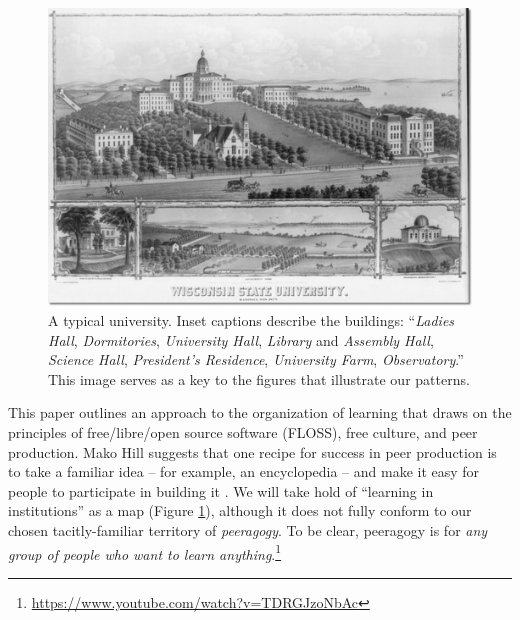 
\begin{figure}
\vspace{-1.15cm}
\begin{center}
\includegraphics[width=.45\textwidth,trim=0 30 10 2, clip=true]{wisconsin-map}
\end{center}
\vspace{-.4cm}
\captionsetup{font=footnotesize,width=.52\textwidth}
\caption{A typical university.  Inset captions describe the buildings:
  ``\textsl{Ladies Hall}, \textsl{Dormitories}, \textsl{University
    Hall}, \textsl{Library} and \textsl{Assembly Hall},
  \textsl{Science Hall}, \textsl{President's Residence},
  \textsl{University Farm}, \textsl{Observatory}.''  This image serves
  as a key to the figures that illustrate our patterns.\label{madison-map}}
\vspace{-1.5cm}
\end{figure}

This paper  outlines an approach to the organization of learning that draws on the principles of free\slash libre\slash open source software (FLOSS), free culture, and peer production.
Mako Hill suggests that one recipe for success in peer production is to take a familiar idea -- for example, an encyclopedia -- and make it easy for people to participate in building it \cite[Chapter 1]{mako-thesis}.  We will take hold of ``learning in institutions'' as a map (Figure \ref{madison-map}), although it does not fully conform to our chosen tacitly-familiar territory of \emph{peeragogy}.  To be clear, peeragogy is for \emph{any group of people who want to learn anything}.\footnote{\url{https://www.youtube.com/watch?v=TDRGJzoNbAc}}

